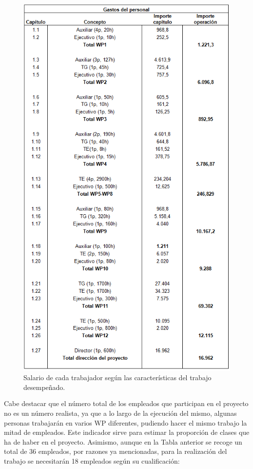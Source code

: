 \documentclass[12pt,oneside,a4paper]{article}
\numberwithin{figure}{section}
\begin{document}
\begin{figure}[H]
\begin{center}
\includegraphics[scale=.8]{Presupuesto4.png}
\caption{Salario de cada trabajador según las características del trabajo desempeñado.}
\end{center}
\end{figure}

Cabe destacar que el número total de los empleados que participan en el proyecto no es un número realista, ya que a lo largo de la ejecución del mismo, algunas personas trabajarán en varios WP diferentes, pudiendo hacer el mismo trabajo la mitad de empleados. Este indicador sirve para estimar la proporción de clases que ha de haber en el proyecto. Asimismo, aunque en la Tabla anterior se recoge un total de 36 empleados, por razones ya mencionadas, para la realización del trabajo se necesitarán 18 empleados según su cualificación:
\end{document}
